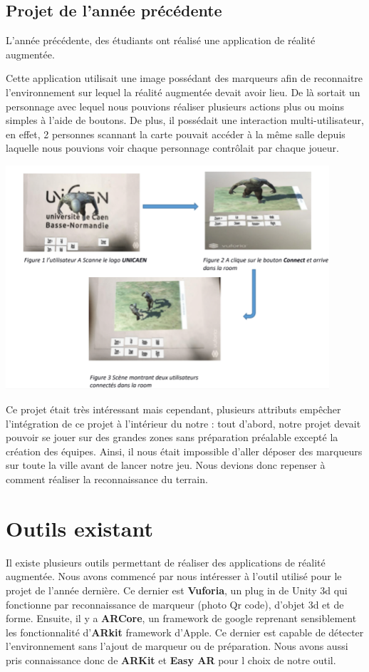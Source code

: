 \documentclass[12pt]{article}
\begin{document}
\subsection{Projet de l'année précédente}
L'année précédente, des étudiants ont réalisé une application de réalité augmentée.\par
Cette application utilisait une image possédant des marqueurs afin de reconnaitre l'environnement sur lequel la réalité augmentée devait avoir lieu. De là sortait un personnage avec lequel nous pouvions réaliser plusieurs actions plus ou moins simples à l'aide de boutons.
\newline
De plus, il possédait une interaction multi-utilisateur, en effet, 2 personnes scannant la carte pouvait accéder à la même salle depuis laquelle nous pouvions voir chaque personnage contrôlait par chaque joueur.
	\begin{center}		\includegraphics[width=0.9\textwidth]{projetAnneeDerniere.png}
	\end{center}
\par
Ce projet était très intéressant mais cependant, plusieurs attributs empêcher l'intégration de ce projet à l'intérieur du notre : tout d'abord, notre projet devait pouvoir se jouer sur des grandes zones sans préparation préalable excepté la création des équipes. Ainsi, il nous était impossible d'aller déposer des marqueurs sur toute la ville avant de lancer notre jeu. Nous devions donc repenser à comment réaliser la reconnaissance du terrain.


\section{Outils existant}
\par
Il existe plusieurs outils permettant de réaliser des applications de réalité augmentée. Nous avons commencé par nous intéresser à l'outil utilisé pour le projet de l'année dernière.
 Ce dernier est \textbf{Vuforia}, un plug in de Unity 3d qui fonctionne par reconnaissance de marqueur (photo Qr code), d'objet 3d et de forme. Ensuite, il y a \textbf{ARCore}, un framework de google
  reprenant sensiblement les fonctionnalité d'\textbf{ARkit} framework d'Apple. Ce dernier est capable de détecter l'environnement sans l'ajout de marqueur ou de préparation. Nous avons aussi
 pris connaissance donc de \textbf{ARKit} et \textbf{Easy AR} pour l choix de notre outil.
\end{document}

